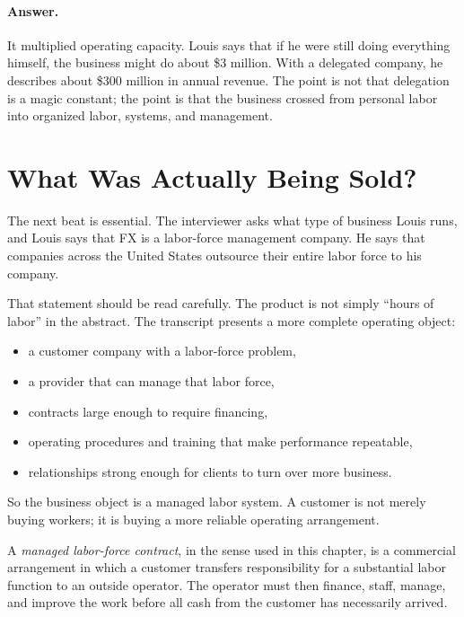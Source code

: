 \paragraph{Answer.} It multiplied operating capacity. Louis says that if he were still doing everything himself, the business might do about \$3 million. With a delegated company, he describes about \$300 million in annual revenue. The point is not that delegation is a magic constant; the point is that the business crossed from personal labor into organized labor, systems, and management.

\section{What Was Actually Being Sold?}

The next beat is essential. The interviewer asks what type of business Louis runs, and Louis says that FX is a labor-force management company. He says that companies across the United States outsource their entire labor force to his company.

That statement should be read carefully. The product is not simply ``hours of labor'' in the abstract. The transcript presents a more complete operating object:
\begin{itemize}
\item a customer company with a labor-force problem,
\item a provider that can manage that labor force,
\item contracts large enough to require financing,
\item operating procedures and training that make performance repeatable,
\item relationships strong enough for clients to turn over more business.
\end{itemize}

So the business object is a managed labor system. A customer is not merely buying workers; it is buying a more reliable operating arrangement.

\begin{definition}
A \emph{managed labor-force contract}, in the sense used in this chapter, is a commercial arrangement in which a customer transfers responsibility for a substantial labor function to an outside operator. The operator must then finance, staff, manage, and improve the work before all cash from the customer has necessarily arrived.
\end{definition}


